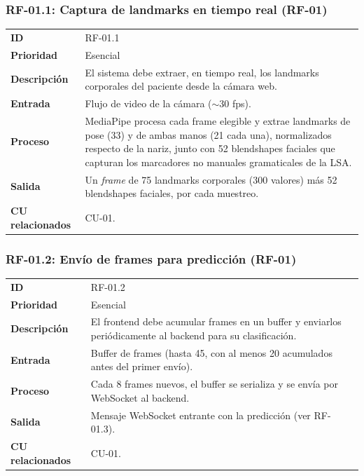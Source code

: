 \subsubsection{RF-01.1: Captura de landmarks en tiempo real (RF-01)}
\begin{table}[H]
\centering
\begin{tabularx}{\textwidth}{l X}
\toprule
\textbf{ID} & RF-01.1 \\
\textbf{Prioridad} & Esencial \\
\textbf{Descripción} & El sistema debe extraer, en tiempo real, los landmarks corporales del paciente desde la cámara web. \\
\textbf{Entrada} & Flujo de video de la cámara ($\sim$30 fps). \\
\textbf{Proceso} & MediaPipe procesa cada frame elegible y extrae landmarks de pose (33) y de ambas manos (21 cada una), normalizados respecto de la nariz, junto con 52 blendshapes faciales que capturan los marcadores no manuales gramaticales de la LSA. \\
\textbf{Salida} & Un \textit{frame} de 75 landmarks corporales (300 valores) más 52 blendshapes faciales, por cada muestreo. \\
\textbf{CU relacionados} & CU-01. \\
\bottomrule
\end{tabularx}
\end{table}

\subsubsection{RF-01.2: Envío de frames para predicción (RF-01)}
\begin{table}[H]
\centering
\begin{tabularx}{\textwidth}{l X}
\toprule
\textbf{ID} & RF-01.2 \\
\textbf{Prioridad} & Esencial \\
\textbf{Descripción} & El frontend debe acumular frames en un buffer y enviarlos periódicamente al backend para su clasificación. \\
\textbf{Entrada} & Buffer de frames (hasta 45, con al menos 20 acumulados antes del primer envío). \\
\textbf{Proceso} & Cada 8 frames nuevos, el buffer se serializa y se envía por WebSocket al backend. \\
\textbf{Salida} & Mensaje WebSocket entrante con la predicción (ver RF-01.3). \\
\textbf{CU relacionados} & CU-01. \\
\bottomrule
\end{tabularx}
\end{table}

